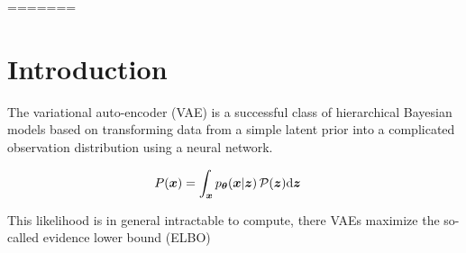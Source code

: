 =======
\section{Introduction}
\label{sec:introduction}

The variational auto-encoder (VAE) is a successful class of hierarchical Bayesian models based on transforming data from a simple latent prior into a complicated observation distribution using a neural network.

\begin{align*}
    P({\boldsymbol{x}}) &= \int_{\boldsymbol{x}} p_{{\boldsymbol \theta}}({\boldsymbol{x}} | {\boldsymbol z})\, \mathcal{P}({\boldsymbol z}) \mathrm{d}{\boldsymbol z}
\end{align*}

This likelihood is in general intractable to compute, there VAEs maximize the so-called evidence lower bound (ELBO)


